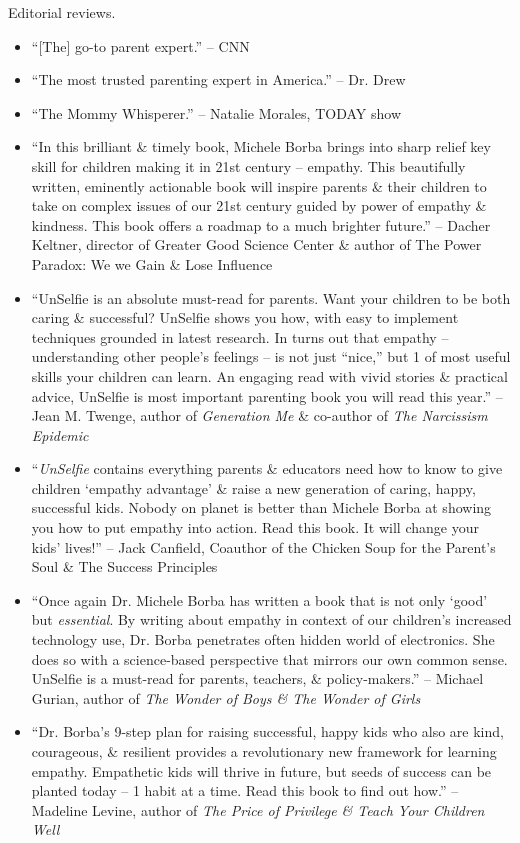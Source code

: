 \documentclass{article}
\begin{document}
\begin{enumerate}
	{\sf Editorial reviews.}
	\begin{itemize}
		\item ``[The] go-to parent expert.'' -- CNN
		\item ``The most trusted parenting expert in America.'' -- Dr. {\sc Drew}
		\item ``The Mommy Whisperer.'' -- {\sc Natalie Morales}, TODAY show
		\item ``In this brilliant \& timely book, {\sc Michele Borba} brings into sharp relief key skill for children making it in 21st century -- empathy. This beautifully written, eminently actionable book will inspire parents \& their children to take on complex issues of our 21st century guided by power of empathy \& kindness. This book offers a roadmap to a much brighter future.'' -- {\sc Dacher Keltner}, director of Greater Good Science Center \& author of The Power Paradox: We we Gain \& Lose Influence
		\item ``UnSelfie is an absolute must-read for parents. Want your children to be both caring \& successful? UnSelfie shows you how, with easy to implement techniques grounded in latest research. In turns out that empathy -- understanding other people's feelings -- is not just ``nice,'' but 1 of most useful skills your children can learn. An engaging read with vivid stories \& practical advice, UnSelfie is most important parenting book you will read this year.'' -- {\sc Jean M. Twenge}, author of {\it Generation Me} \& co-author of {\it The Narcissism Epidemic}
		\item ``{\it UnSelfie} contains everything parents \& educators need how to know to give children `empathy advantage' \& raise a new generation of caring, happy, successful kids. Nobody on planet is better than {\sc Michele Borba} at showing you how to put empathy into action. Read this book. It will change your kids' lives!'' -- {\sc Jack Canfield}, Coauthor of the {\sc Chicken Soup for the Parent's Soul \& The Success Principles}
		\item ``Once again Dr. {\sc Michele Borba} has written a book that is not only `good' but {\it essential}. By writing about empathy in context of our children's increased technology use, Dr. {\sc Borba} penetrates often hidden world of electronics. She does so with a science-based perspective that mirrors our own common sense. UnSelfie is a must-read for parents, teachers, \& policy-makers.'' -- {\sc Michael Gurian}, author of {\it The Wonder of Boys \& The Wonder of Girls}
		\item ``Dr. {\sc Borba}'s 9-step plan for raising successful, happy kids who also are kind, courageous, \& resilient provides a revolutionary new framework for learning empathy. Empathetic kids will thrive in future, but seeds of success can be planted today -- 1 habit at a time. Read this book to find out how.'' -- {\sc Madeline Levine}, author of {\it The Price of Privilege \& Teach Your Children Well}

\end{itemize}
\end{enumerate}
\end{document}
